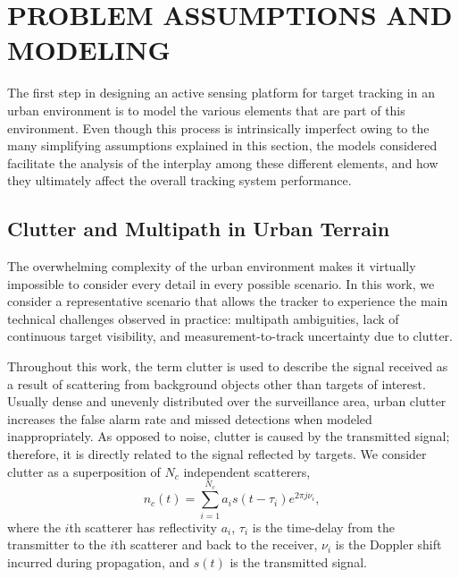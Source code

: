 \documentclass[times]{asjcauth}
\begin{document}
\section{PROBLEM ASSUMPTIONS AND MODELING}
\label{secmodeling}

The first step in designing an active sensing platform for target tracking in an urban environment is to model the various elements that are part of this environment. Even though this process is intrinsically imperfect owing to the many simplifying assumptions explained in this section, the models considered facilitate the analysis of the interplay among these different elements, and how they ultimately affect the overall tracking system performance.

\subsection{Clutter and Multipath in Urban Terrain}
\label{securban}

The overwhelming complexity of the urban environment makes it virtually impossible to consider every detail in every possible scenario. In this work, we consider a representative scenario that allows the tracker to experience the main technical challenges observed in practice: multipath ambiguities, lack of continuous target visibility, and measurement-to-track uncertainty due to clutter.

Throughout this work, the term clutter is used to describe the signal received as a result of scattering from background objects other than targets of interest. Usually dense and unevenly distributed over the surveillance area, urban clutter increases the false alarm rate and missed detections when modeled inappropriately. As opposed to noise, clutter is caused by the transmitted signal; therefore, it is directly related to the signal reflected by targets. We consider clutter as a superposition of $N_{c}$ independent scatterers,
\begin{equation*}
n_{c}(t) = \sum_{i=1}^{N_{c}}a_{i}s\left(t-\tau_{i}\right)e^{2\pi
j\nu_{i}},
\end{equation*}
\noindent where the $i$th scatterer has reflectivity $a_{i}$, $\tau_{i}$ is the time-delay from the transmitter to the $i$th scatterer and back to the receiver, $\nu_{i}$ is the Doppler shift incurred during propagation, and $s(t)$ is the transmitted signal.
\end{document}
